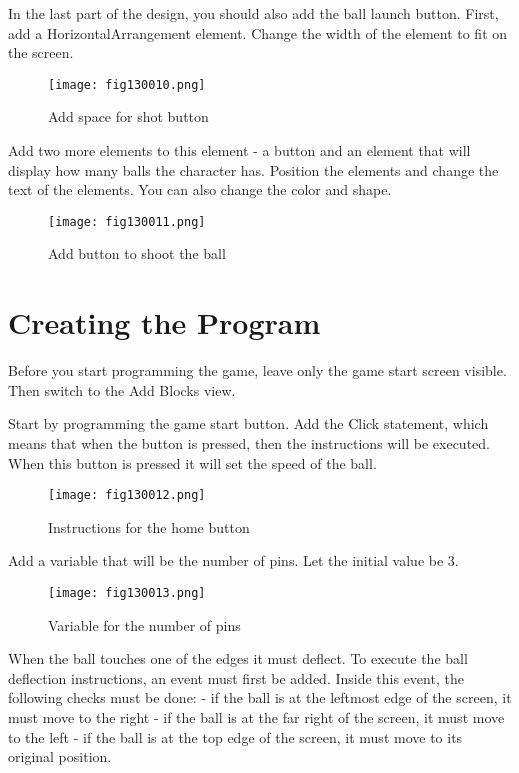 In the last part of the design, you should also add the ball launch button. First, add a HorizontalArrangement element. Change the width of the element to fit on the screen.

\begin{figure}[H]
   \centering
   \texttt{[image: fig130010.png]}
   \caption{Add space for shot button}
\label{fig130010}
\end{figure}

Add two more elements to this element - a button and an element that will display how many balls the character has. Position the elements and change the text of the elements. You can also change the color and shape.

\begin{figure}[H]
   \centering
   \texttt{[image: fig130011.png]}
   \caption{Add button to shoot the ball}
\label{fig130011}
\end{figure}

\section{Creating the Program}

Before you start programming the game, leave only the game start screen visible. Then switch to the Add Blocks view.

Start by programming the game start button. Add the Click statement, which means that when the button is pressed, then the instructions will be executed. When this button is pressed it will set the speed of the ball.

\begin{figure}[H]
   \centering
   \texttt{[image: fig130012.png]}
   \caption{Instructions for the home button}
\label{fig130012}
\end{figure}

Add a variable that will be the number of pins. Let the initial value be 3.

\begin{figure}[H]
   \centering
   \texttt{[image: fig130013.png]}
   \caption{Variable for the number of pins}
\label{fig130013}
\end{figure}

When the ball touches one of the edges it must deflect. To execute the ball deflection instructions, an event must first be added. Inside this event, the following checks must be done:
- if the ball is at the leftmost edge of the screen, it must move to the right
- if the ball is at the far right of the screen, it must move to the left
- if the ball is at the top edge of the screen, it must move to its original position.

